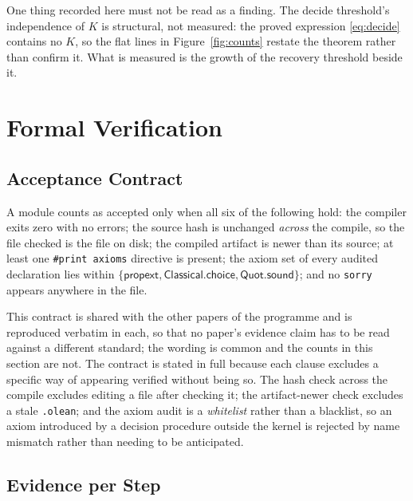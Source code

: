 \documentclass[conference]{IEEEtran}
\theoremstyle{definition}
\begin{document}
One thing recorded here must not be read as a finding. The decide threshold's independence of
$K$ is structural, not measured: the proved expression \eqref{eq:decide} contains no $K$, so
the flat lines in Figure~\ref{fig:counts} restate the theorem rather than confirm it. What is
measured is the growth of the recovery threshold beside it.

\section{Formal Verification}
\label{sec:verification}

\subsection{Acceptance Contract}

A module counts as accepted only when all six of the following hold: the compiler exits zero
with no errors; the source hash is unchanged \emph{across} the compile, so the file checked is
the file on disk; the compiled artifact is newer than its source; at least one
\texttt{\#print axioms} directive is present; the axiom set of every audited declaration lies
within $\{\textsf{propext},\textsf{Classical.choice},\textsf{Quot.sound}\}$; and no
\texttt{sorry} appears anywhere in the file.

This contract is shared with the other papers of the programme and is reproduced verbatim in
each, so that no paper's evidence claim has to be read against a different standard; the
wording is common and the counts in this section are not. The contract is stated in full
because each clause excludes a specific way of appearing verified without being so. The hash check across the compile excludes editing a file after
checking it; the artifact-newer check excludes a stale \texttt{.olean}; and the axiom audit is
a \emph{whitelist} rather than a blacklist, so an axiom introduced by a decision procedure
outside the kernel is rejected by name mismatch rather than needing to be anticipated.

\subsection{Evidence per Step}
\end{document}
